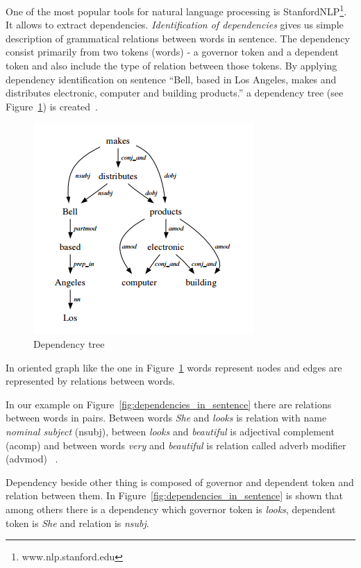 \documentclass{iitsrc}
\begin{document}
		One of the most popular tools for natural language processing is StanfordNLP\footnote{www.nlp.stanford.edu}. It allows to extract dependencies. \textit{Identification of dependencies} gives us simple description of grammatical relations between words in sentence. The dependency consist primarily from two tokens (words) - a governor token and a dependent token and also include the type of relation between those tokens.
		By applying dependency identification on sentence ``Bell, based in Los Angeles, makes and distributes electronic, computer and building products.'' a dependency tree (see Figure~\ref{fig:dependency_tree}) is created~\cite{StanfordDepManual}.
	
		\begin{figure}[h]
			\begin{center}
				\includegraphics[scale=0.5]{dependency_tree}
				\caption{Dependency tree~\cite{StanfordDepManual}}
				\label{fig:dependency_tree}
			\end{center}
		\end{figure}
	
		In oriented graph like the one in Figure~\ref{fig:dependency_tree} words represent nodes and edges are represented by relations between words.
	
		In our example on Figure~\ref{fig:dependencies_in_sentence} there are relations between words in pairs. Between words \textit{She} and \textit{looks} is relation with name \textit{nominal subject} (nsubj), between \textit{looks} and \textit{beautiful} is adjectival complement (acomp) and between words \textit{very} and \textit{beautiful} is relation called adverb modifier (advmod) ~\cite{StanfordDepManual}.
	
		Dependency beside other thing is composed of governor and dependent token and relation between them. In Figure~\ref{fig:dependencies_in_sentence} is shown that among others there is a dependency which governor token is \textit{looks}, dependent token is \textit{She} and relation is \textit{nsubj}.
	
\end{document}
